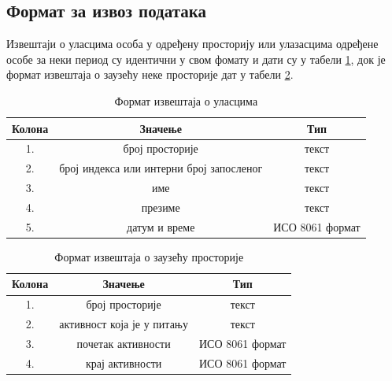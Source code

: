 \documentclass[a4paper, 12pt, diplomski]{etfcyr}
\begin{document}
			\newpage

			\subsection{Формат за извоз података}
				\begin{justify}
					Извештаји о уласцима особа у одређену просторију или улазасцима одређене особе за неки период су идентични у свом фомату и дати су у табели \ref{table:5}, док је формат извештаја о заузећу неке просторије дат у табели \ref{table:6}.
				\end{justify}
				\begin{table}[H]
					\centering
					\begin{tabular}{ c|c|c }
						Колона & Значење & Тип \\
						\hline\hline
						1. & број просторије & текст \\
						2. & број индекса или интерни број запосленог & текст \\
						3. & име & текст \\
						4. & презиме & текст \\
						5. & датум и време & ИСО 8061 формат \\
						\hline
					\end{tabular}
					\caption{Формат извештаја о уласцима}
					\label{table:5}
				\end{table}
				\begin{table}[H]
					\centering
					\begin{tabular}{ c|c|c }
						Колона & Значење & Тип \\
						\hline\hline
						1. & број просторије & текст \\
						2. & активност која је у питању & текст \\
						3. & почетак активности & ИСО 8061 формат \\
						4. & крај активности & ИСО 8061 формат \\
						\hline
					\end{tabular}
					\caption{Формат извештаја о заузећу просторије}
					\label{table:6}
				\end{table}
\end{document}
